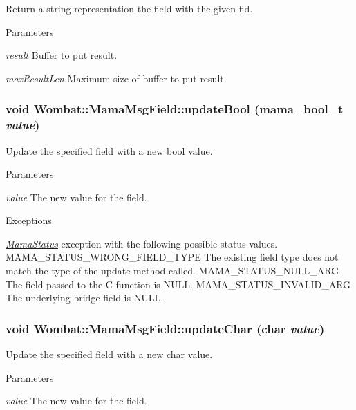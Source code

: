 Return a string representation the field with the given fid. 
\begin{DoxyParams}{Parameters}
\item[{\em result}]Buffer to put result. \item[{\em maxResultLen}]Maximum size of buffer to put result. \end{DoxyParams}
\hypertarget{classWombat_1_1MamaMsgField_a65cad43a0a3c4fe0f30a8a23e23b1df3}{
\subsubsection[{updateBool}]{\setlength{\rightskip}{0pt plus 5cm}void Wombat::MamaMsgField::updateBool (mama\_\-bool\_\-t {\em value})}}
\label{classWombat_1_1MamaMsgField_a65cad43a0a3c4fe0f30a8a23e23b1df3}


Update the specified field with a new bool value. 
\begin{DoxyParams}{Parameters}
\item[{\em value}]The new value for the field.\end{DoxyParams}

\begin{DoxyExceptions}{Exceptions}
\item[{\em \hyperlink{classWombat_1_1MamaStatus}{MamaStatus}}]exception with the following possible status values. MAMA\_\-STATUS\_\-WRONG\_\-FIELD\_\-TYPE The existing field type does not match the type of the update method called. MAMA\_\-STATUS\_\-NULL\_\-ARG The field passed to the C function is NULL. MAMA\_\-STATUS\_\-INVALID\_\-ARG The underlying bridge field is NULL. \end{DoxyExceptions}
\hypertarget{classWombat_1_1MamaMsgField_ae12fa607cf0e0006dc9d3e0c3365fe15}{
\subsubsection[{updateChar}]{\setlength{\rightskip}{0pt plus 5cm}void Wombat::MamaMsgField::updateChar (char {\em value})}}
\label{classWombat_1_1MamaMsgField_ae12fa607cf0e0006dc9d3e0c3365fe15}


Update the specified field with a new char value. 
\begin{DoxyParams}{Parameters}
\item[{\em value}]The new value for the field.\end{DoxyParams}

